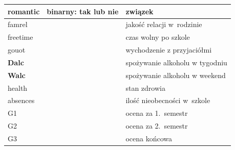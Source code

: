 \begin{table}[h!]
\begin{tabular}{|p{1.4cm}|p{3cm}|p{3cm}|}
romantic   &   binarny: tak lub nie   &   związek \\ \hline
famrel  &      & jakość relacji w~rodzinie  \\ \hline
freetime   &      & czas wolny po szkole   \\ \hline
gouot   &      &  wychodzenie z przyjaciółmi  \\ \hline
\textbf{Dalc}  &      & spożywanie alkoholu w tygodniu   \\ \hline
\textbf{Walc}   &      &  spożywanie alkoholu w weekend  \\ \hline
health   &      & stan zdrowia   \\ \hline
absences  &      &  ilość nieobecności w~szkole  \\ \hline
G1  &      &   ocena za 1.~semestr \\ \hline
G2  &      &  ocena za 2.~semestr  \\ \hline
G3   &      &  ocena końcowa  \\ \hline
\end{tabular}
\end{table}
\FloatBarrier
